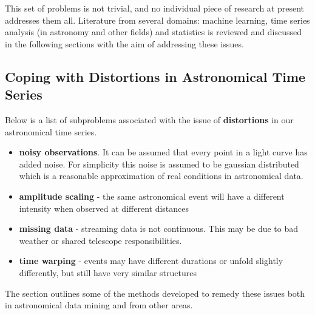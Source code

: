 	This set of problems is not trivial, and no individual piece of research at present addresses them all. Literature from several domains: machine learning, time series analysis (in astronomy and other fields) and statistics is reviewed and discussed in the following sections with the aim of addressing these issues.
		

\subsection{Coping with Distortions in Astronomical Time Series}
	Below is a list of subproblems associated with the issue of \textbf{distortions} in our astronomical time series.
	\begin{itemize}
		\item \textbf{noisy observations}. It can be assumed that every point in a light curve has added noise. For simplicity this noise is assumed to be gaussian distributed which is a reasonable approximation of real conditions in astronomical data.
		\item \textbf{amplitude scaling} - the same astronomical event will have a different intensity when observed at different distances
		\item \textbf{missing data} - streaming data is not continuous. This may be due to bad weather or shared telescope responsibilities.
		\item \textbf{time warping} - events may have different durations or unfold slightly differently, but still have very similar structures
	\end{itemize}
	The section outlines some of the methods developed to remedy these issues both in astronomical data mining and from other areas.
	
